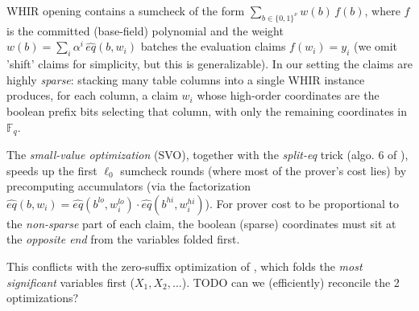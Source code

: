 \documentclass{article}
\theoremstyle{definition}
\newcommand{\Fq}{\mathbb F_q}
\begin{document}
WHIR opening contains a sumcheck of the form $\sum_{b \in \{0,1\}^\nu} w(b)\, f(b)$, where $f$ is the committed (base-field) polynomial and the weight $w(b) = \sum_i \alpha^i\, \hat{eq}(b, w_i)$ batches the evaluation claims $f(w_i) = y_i$ (we omit 'shift' claims for simplicity, but this is generalizable). In our setting the claims are highly \emph{sparse}: stacking many table columns into a single WHIR instance produces, for each column, a claim $w_i$ whose high-order coordinates are the boolean prefix bits selecting that column, with only the remaining coordinates in $\Fq$.

The \emph{small-value optimization} (SVO), together with the \emph{split-eq} trick (algo. 6 of \cite{Speeding-Up-Sum-Check-Proving}), speeds up the first $\ell_0$  sumcheck rounds (where most of the prover's cost lies) by precomputing accumulators (via the factorization $\hat{eq}(b, w_i) = \hat{eq}(b^{lo}, w_i^{lo}) \cdot \hat{eq}(b^{hi}, w_i^{hi})$). For prover cost to be proportional to the \emph{non-sparse} part of each claim, the boolean (sparse) coordinates must sit at the \emph{opposite end} from the variables folded first.

This conflicts with the zero-suffix optimization of , which folds the \emph{most significant} variables first ($X_1, X_2, \dots$). TODO can we (efficiently) reconcile the 2 optimizations?

\clearpage


\end{document}
